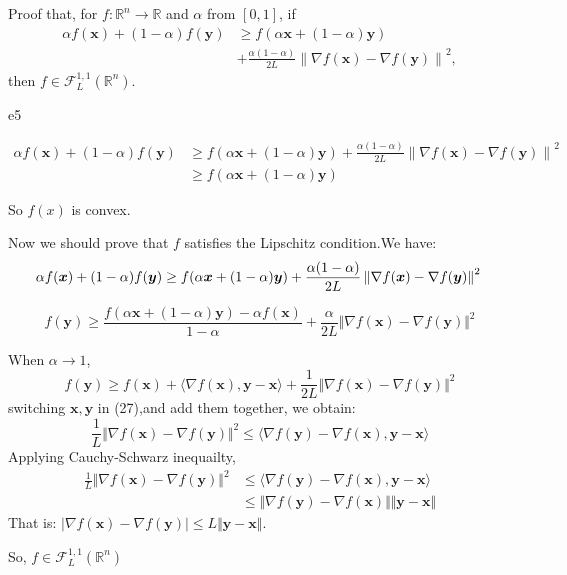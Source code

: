 \documentclass{article}
\newcommand{\xB}{\bm{x}}
\newcommand{\yB}{\bm{y}}
\newcommand{\RBB}{\mathbb{R}}
\newcommand{\FM}{\mathcal{F}}
\newcommand{\functiontype}[3]{\FM_{#1}^{#2,#3}(\RBB^n)}
\newcommand{\normgen}[1]{\left\| #1 \right\|}
\begin{document}
\begin{excercise}\label{e5}
Proof that, for $f: \RBB^n \rightarrow \RBB$ and $\alpha$ from $[0,1]$,  if
\begin{align*} 
	\alpha f(\xB) + (1-\alpha) f(\yB) &\geq f( \alpha \xB + (1-\alpha) \yB) \nonumber \\
	&+ \frac{\alpha(1-\alpha)}{2L} \normgen{\nabla f(\xB) - \nabla f(\yB)}^2, 
\end{align*}
then $f \in \functiontype{L}{1}{1}$.
\end{excercise}
\begin{PROOF}{e5}

	\begin{align}
		\alpha f(\xB) + (1-\alpha) f(\yB) &\geq f( \alpha \xB + (1-\alpha) \yB) \nonumber+ \frac{\alpha(1-\alpha)}{2L} \normgen{\nabla f(\xB) - \nabla f(\yB)}^2\\
		& \ge f(\alpha \xB+(1-\alpha)\yB)
	\end{align}

	So $f(x)$ is convex.


	Now we should prove that $f$ satisfies the Lipschitz condition.We have:
	\begin{equation}
		\alpha f(\xB) + (1-\alpha) f(\yB) \geq f( \alpha \xB + (1-\alpha) \yB) \nonumber+ \frac{\alpha(1-\alpha)}{2L} \normgen{\nabla f(\xB) - \nabla f(\yB)}^2\\
	\end{equation}
		
	\begin{equation}
		f(\yB)\ge \frac{f(\alpha \xB + (1-\alpha) \yB)-\alpha f(\xB)}{1-\alpha}+\frac{\alpha}{2L} \Vert \nabla f(\xB) - \nabla f(\yB)\Vert ^2
	\end{equation}

	When $\alpha\rightarrow 1$,
	\begin{equation}
		f(\yB) \ge f(\xB)+\langle\nabla f(\xB),\yB-\xB\rangle+\frac{1}{2L}\Vert \nabla f(\xB)-\nabla f(\yB)\Vert ^2
	\end{equation} 
	switching $\xB,\yB$ in (27),and add them together, we obtain:
	\begin{equation}
		\frac{1}{L}\Vert \nabla f(\xB)-\nabla f(\yB)\Vert ^2\le \langle\nabla f(\yB)-\nabla f(\xB),\yB-\xB\rangle
	\end{equation}
	Applying Cauchy-Schwarz inequailty,
	\begin{align}
		\frac{1}{L}\Vert \nabla f(\xB)-\nabla f(\yB)\Vert ^2 &\le \langle\nabla f(\yB)-\nabla f(\xB),\yB-\xB\rangle\\
		&\le \Vert \nabla f(\yB)-\nabla f(\xB)\Vert \Vert \yB-\xB\Vert
	\end{align}
	That is: $\vert \nabla f(\xB)-\nabla f(\yB)\vert \le L\Vert \yB-\xB \Vert$.
	
	So, $f\in \mathcal{F}_{L}^{1,1}(\mathbb{R}^n)$



\end{PROOF}
\end{document}
